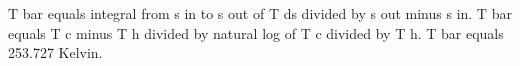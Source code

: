 T bar equals integral from s in to s out of T ds divided by s out minus s in.  
T bar equals T c minus T h divided by natural log of T c divided by T h.  
T bar equals 253.727 Kelvin.